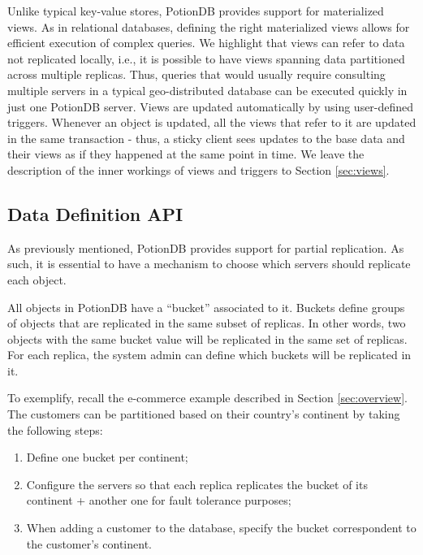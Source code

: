 \documentclass{vldb}
\newcommand{\grumbler}[2]{{\color{red}{\bf #1:} #2}}
\renewcommand{\grumbler}[2]{}
\newcommand{\andre}[1]{\grumbler{andre}{#1}}
\begin{document}
\andre{Should we refer that our views are ``novel'' due to supporting data not replicated locally?}

Unlike typical key-value stores, PotionDB provides support for materialized views.
As in relational databases, defining the right materialized views allows for efficient execution of complex queries.
We highlight that views can refer to data not replicated locally, i.e., it is possible to have views spanning data partitioned across multiple replicas.
Thus, queries that would usually require consulting multiple servers in a typical geo-distributed database can be executed quickly in just one PotionDB server.
Views are updated automatically by using user-defined triggers.
Whenever an object is updated, all the views that refer to it are updated in the same transaction - thus, a sticky client sees updates to the base data and their views as if they happened at the same point in time.
We leave the description of the inner workings of views and triggers to Section \ref{sec:views}.


\subsection{Data Definition API}
\label{subsec:dataAPI}

As previously mentioned, PotionDB provides support for partial replication.
As such, it is essential to have a mechanism to choose which servers should replicate each object.

All objects in PotionDB have a ``bucket'' associated to it.
Buckets define groups of objects that are replicated in the same subset of replicas. In other words, two objects with the same bucket value will be replicated in the same set of replicas.
For each replica, the system admin can define which buckets will be replicated in it.

To exemplify, recall the e-commerce example described in Section \ref{sec:overview}.
The customers can be partitioned based on their country's continent by taking the following steps: 

\begin{enumerate}
	\item Define one bucket per continent;
	\item Configure the servers so that each replica replicates the bucket of its continent + another one for fault tolerance purposes;
	\item When adding a customer to the database, specify the bucket correspondent to the customer's continent.
\end{enumerate}
\end{document}
